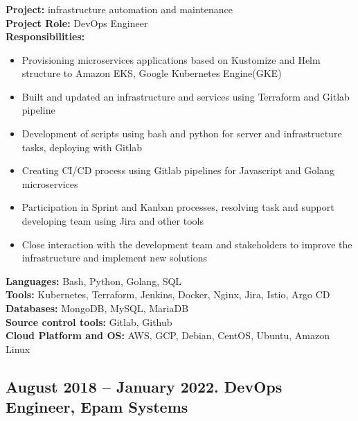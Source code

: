 \documentclass[letterpaper]{article}
\begin{document}
\subsubsection{}
\label{sec-2-1-1}
\textbf{Project:} infrastructure automation and maintenance\\
\textbf{Project Role:}  DevOps Engineer\\
\textbf{Responsibilities:}\\
\begin{itemize}
	\item Provisioning microservices applications based on Kustomize and Helm structure to Amazon EKS, Google Kubernetes Engine(GKE)
	\item Built and updated an infrastructure and services using Terraform and Gitlab pipeline
	\item Development of scripts using bash and python for server and infrastructure tasks, deploying with Gitlab
	\item Creating CI/CD process using Gitlab pipelines for Javascript and Golang microservices
	\item Participation in Sprint and Kanban processes, resolving task and support developing team using Jira and other tools
	\item Close interaction with the development team and stakeholders to improve the infrastructure and implement new solutions
\end{itemize}
\textbf{Languages:} Bash, Python, Golang, SQL\\
\textbf{Tools:} Kubernetes, Terraform, Jenkins, Docker, Nginx, Jira, Istio, Argo CD \\
\textbf{Databases:} MongoDB, MySQL, MariaDB\\
\textbf{Source control tools:} Gitlab, Github\\
\textbf{Cloud Platform and OS:} AWS, GCP, Debian, CentOS, Ubuntu, Amazon Linux \\
\subsection{{August 2018 – January 2022}. DevOps Engineer, Epam Systems}
\label{sec-2-1}
\end{document}
